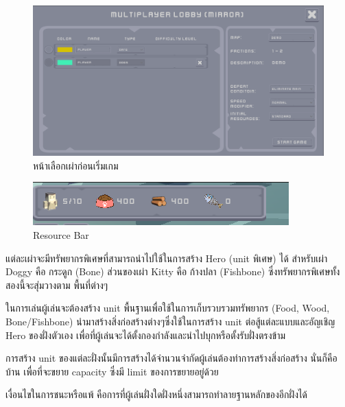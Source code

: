 \begin{figure}[h]
  \includegraphics[width=\linewidth]{joingamePage.png}
  \caption{หน้าเลือกเผ่าก่อนเริ่มเกม}
\end{figure}

\begin{figure}[h]
  \includegraphics[width=\linewidth]{resource.png}
  \caption{Resource Bar}
\end{figure}

\enskip แต่ละเผ่าจะมีทรัพยากรพิเศษที่สามารถนําไปใช้ในการสร้าง Hero (unit พิเศษ) ได้ สําหรับเผ่า Doggy คือ กระดูก (Bone) ส่วนของเผ่า Kitty คือ ก้างปลา (Fishbone) ซึ่งทรัพยากรพิเศษทั้งสองนี้จะสุ่มวางตาม
พื้นที่ต่างๆ

\enskip ในการเล่นผู้เล่นจะต้องสร้าง unit พื้นฐานเพื่อใช้ในการเก็บรวบรวมทรัพยากร (Food, Wood, Bone/Fishbone)
นํามาสร้างสิ่งก่อสร้างต่างๆซึ่งใช้ในการสร้าง unit ต่อสู้แต่ละแบบและอัญเชิญ Hero ของฝั่งตัวเอง 
เพื่อที่ผู้เล่นจะได้ตั้งกองกําลังและนําไปบุกหรือตั้งรับฝั่งตรงข้าม

\enskip การสร้าง unit ของแต่ละฝั่งนั้นมีการสร้างได้จํานวนจํากัดผู้เล่นต้องทําการสร้างสิ่งก่อสร้าง 
นั่นก็คือ บ้าน เพื่อที่จะขยาย capacity ซึ่งมี limit ของการขยายอยู่ด้วย

\enskip เงื่อนไขในการชนะหรือแพ้ คือการที่ผู้เล่นฝั่งใดฝั่งหนึ่งสามารถทําลายฐานหลักของอีกฝั่งได้

